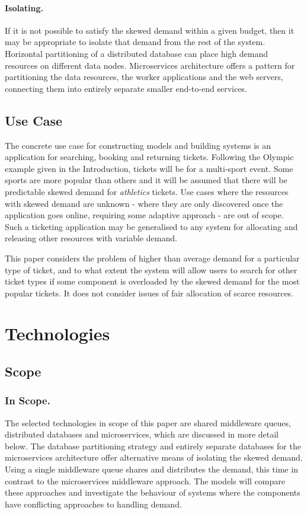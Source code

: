 \documentclass[runningheads]{llncs}
\begin{document}
\paragraph{Isolating.} If it is not possible to satisfy the skewed demand within a given budget, then it may be appropriate to isolate that demand from the rest of the system.  Horizontal partitioning of a distributed database can place high demand resources on different data nodes.  Microservices architecture offers a pattern for partitioning the data resources, the worker applications and the web servers, connecting them into entirely separate smaller end-to-end services.

\subsection{Use Case}

The concrete use case for constructing models and building systems is an application for searching, booking and returning tickets.  Following the Olympic example given in the Introduction, tickets will be for a multi-sport event.  Some sports are more popular than others and it will be assumed that there will be predictable skewed demand for {\itshape athletics} tickets.  Use cases where the resources with skewed demand are unknown - where they are only discovered once the application goes online, requiring some adaptive approach - are out of scope.  Such a ticketing application may be generalised to any system for allocating and releasing other resources with variable demand.

This paper considers the problem of higher than average demand for a particular type of ticket, and to what extent the system will allow users to search for other ticket types if some component is overloaded by the skewed demand for the most popular tickets.  It does not consider issues of fair allocation of scarce resources.

%
%

\section{Technologies}\label{sec:technologies}

%
%
\subsection{Scope}
\subsubsection{In Scope.}  The selected technologies in scope of this paper are shared middleware queues, distributed databases and microservices, which are discussed in more detail below.  The database partitioning strategy and entirely separate databases for the microservices architecture offer alternative means of isolating the skewed demand.  Using a single middleware queue shares and distributes the demand, this time in contrast to the microservices middleware approach.  The models will compare these approaches and investigate the behaviour of systems where the components have conflicting approaches to handling demand.
\end{document}
